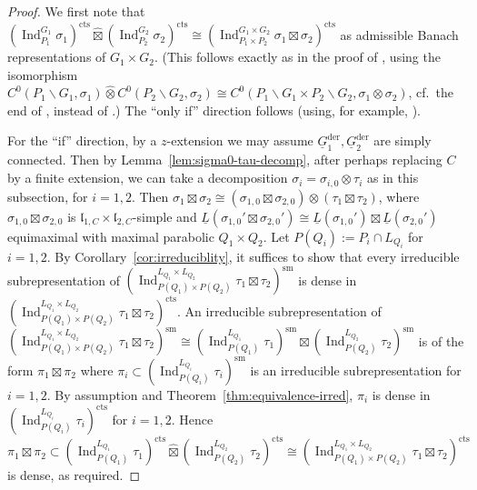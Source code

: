 \documentclass[a4paper]{amsart}
\numberwithin{equation}{section}
\theoremstyle{remark}
\theoremstyle{definition}
\DeclareMathOperator{\Ind}{Ind}
\newcommand{\sm}{\mathrm{sm}}
\newcommand{\alggrp}[1]{\underline{#1}}
\newcommand{\der}{\mathrm{der}}
\newcommand{\cts}{\mathrm{cts}}
\renewcommand{\simeq}{\cong}
\newcommand{\wh}[1]{\widehat{#1}}
\begin{document}
\begin{proof}
We first note that $(\Ind_{P_{1}}^{G_{1}}\sigma_{1})^{\cts}\widehat{\boxtimes}(\Ind_{P_{2}}^{G_{2}}\sigma_{2})^{\cts}\simeq (\Ind_{P_{1}\times P_{2}}^{G_{1}\times G_{2}}\sigma_{1}\boxtimes\sigma_{2})^{\cts}$ as admissible Banach representations of $G_1 \times G_2$.
(This follows exactly as in the proof of \cite[Lemma 2.8]{MR4190408}, using the isomorphism $C^0(P_1\backslash G_1,\sigma_1) \wh\otimes C^0(P_2\backslash G_2,\sigma_2) \cong C^0(P_1\backslash G_1 \times P_2\backslash G_2,\sigma_1 \otimes \sigma_2)$, cf.\ the end of \cite[\S17]{MR1869547}, instead of \cite[(2.6)]{MR4190408}.)
The ``only if'' direction follows (using, for example, \cite[Lemma 2.1(ii)]{MR4190408}).

For the ``if'' direction, by a $z$-extension we may assume $\alggrp{G}_{1}^{\der},\alggrp{G}_{2}^{\der}$ are simply connected.
Then by Lemma~\ref{lem:sigma0-tau-decomp}, after perhaps replacing $C$ by a finite extension, we can take a decomposition $\sigma_{i} = \sigma_{i,0}\otimes \tau_{i}$ as in this subsection, for $i = 1,2$.
Then $\sigma_1 \boxtimes \sigma_2 \cong (\sigma_{1,0} \boxtimes \sigma_{2,0}) \otimes (\tau_1 \boxtimes \tau_2)$, where $\sigma_{1,0} \boxtimes \sigma_{2,0}$ is $\mathfrak l_{1,C} \times \mathfrak l_{2,C}$-simple and $\underline L(\sigma_{1,0}' \boxtimes \sigma_{2,0}') \cong \underline L(\sigma_{1,0}') \boxtimes \underline L(\sigma_{2,0}')$ equimaximal with maximal parabolic $Q_1 \times Q_2$.
Let $P(Q_i) := P_i \cap L_{Q_i}$ for $i = 1,2$.
By Corollary~\ref{cor:irreduciblity}, it suffices to show that every irreducible subrepresentation of $(\Ind_{P(Q_1) \times P(Q_2)}^{L_{Q_1}\times L_{Q_2}}\tau_{1}\boxtimes\tau_{2})^{\sm}$ is dense in $(\Ind_{P(Q_1) \times P(Q_2)}^{L_{Q_1}\times L_{Q_2}}\tau_{1}\boxtimes\tau_{2})^{\cts}$.
An irreducible subrepresentation of $(\Ind_{P(Q_1) \times P(Q_2)}^{L_{Q_1}\times L_{Q_2}}\tau_{1}\boxtimes\tau_{2})^{\sm}\simeq (\Ind_{P(Q_1)}^{L_{Q_1}}\tau_{1})^{\sm}\boxtimes (\Ind_{P(Q_2)}^{L_{Q_2}}\tau_{2})^{\sm}$ is of the form $\pi_{1}\boxtimes \pi_{2}$ where $\pi_{i}\subset (\Ind_{P(Q_i)}^{L_{Q_i}}\tau_{i})^{\sm}$ is an irreducible subrepresentation for $i = 1,2$.
By assumption and Theorem~\ref{thm:equivalence-irred}, $\pi_{i}$ is dense in $(\Ind_{P(Q_i)}^{L_{Q_i}}\tau_{i})^{\cts}$ for $i = 1,2$.
Hence $\pi_{1}\boxtimes\pi_{2}\subset (\Ind_{P(Q_1)}^{L_{Q_1}}\tau_{1})^{\cts}\widehat{\boxtimes}(\Ind_{P(Q_2)}^{L_{Q_2}}\tau_{2})^{\cts}\simeq (\Ind_{P(Q_1) \times P(Q_2)}^{L_{Q_1}\times L_{Q_2}}\tau_{1}\boxtimes\tau_{2})^{\cts}$ is dense, as required.
\end{proof}
\end{document}
